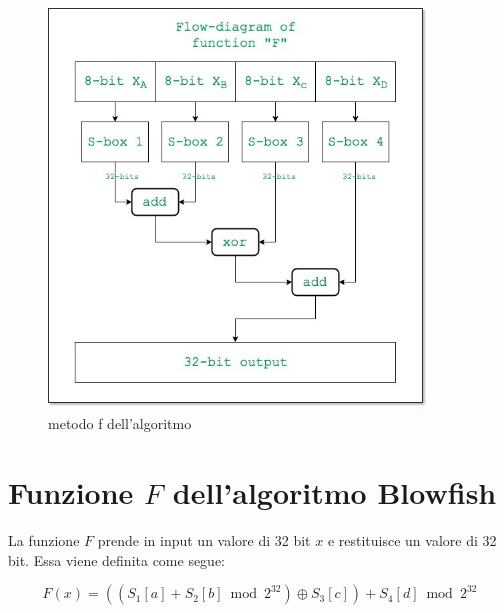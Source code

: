 \documentclass[a4paper,12pt]{report}
\begin{document}
	\begin{figure}[H]
		\centering
		\includegraphics[width=0.9\textwidth]{F-blowfish.jpg}
		\caption{metodo f dell'algoritmo \cite{blowfish-algorithm}}
		\label{fig:f}
	\end{figure}
	\section*{Funzione $F$ dell'algoritmo Blowfish}

	La funzione $F$ prende in input un valore di 32 bit $x$ e restituisce un valore
	di 32 bit. Essa viene definita come segue:

	\[
	F(x) = ((S_1[a] + S_2[b] \bmod 2^{32}) \oplus S_3[c]) + S_4[d] \bmod 2^{32}
	\]
\end{document}
